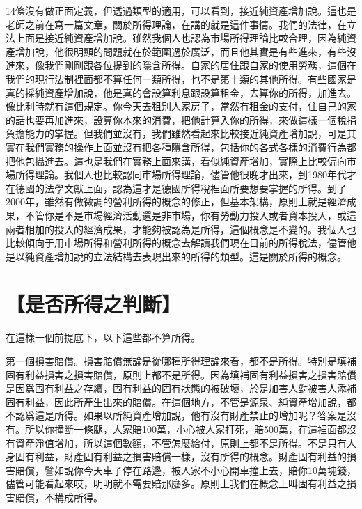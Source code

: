 \documentclass[]{ctexbook}
\begin{document}
14條沒有做正面定義，但透過類型的適用，可以看到，接近純資產增加說。這也是老師之前在寫一篇文章，關於所得理論，在講的就是這件事情。我們的法律，在立法上面是接近純資產增加說。雖然我個人也認為市場所得理論比較合理，因為純資產增加說，他很明顯的問題就在於範圍過於廣泛，而且他其實是有些進來，有些沒進來，像我們剛剛跟各位提到的隱含所得。自家的居住跟自家的使用勞務，這個在我們的現行法制裡面都不算任何一類所得，也不是第十類的其他所得。有些國家是真的採純資產增加說，他是真的會設算利息跟設算租金，去算你的所得，加進去。像比利時就有這個規定。你今天去租別人家房子，當然有租金的支付，住自己的家的話也要再加進來，設算你本來的消費，把他計算入你的所得，來做這樣一個稅捐負擔能力的掌握。但我們並沒有，我們雖然看起來比較接近純資產增加說，可是其實在我們實務的操作上面並沒有把各種隱含所得，包括你的各式各樣的消費行為都把他包攝進去。這也是我們在實務上面來講，看似純資產增加，實際上比較偏向市場所得理論。我個人也比較認同市場所得理論，儘管他很晚才出來，到1980年代才在德國的法學文獻上面，認為這才是德國所得稅裡面所要想要掌握的所得。到了2000年，雖然有做微調的營利所得的概念的修正，但基本架構，原則上就是經濟成果，不管你是不是市場經濟活動還是非市場，你有勞動力投入或者資本投入，或這兩者相加的投入的經濟成果，才能夠被認為是所得，這個概念是不變的。我個人也比較傾向于用市場所得和營利所得的概念去解讀我們現在目前的所得稅法，儘管他是以純資產增加說的立法結構去表現出來的所得的類型。這是關於所得的概念。

\hypertarget{ux662fux5426ux6240ux5f97ux4e4bux5224ux65b7}{%
\section{【是否所得之判斷】}\label{ux662fux5426ux6240ux5f97ux4e4bux5224ux65b7}}

在這樣一個前提底下，以下這些都不算所得。

第一個損害賠償。損害賠償無論是從哪種所得理論來看，都不是所得。特別是填補固有利益損害之損害賠償，原則上都不是所得。因為填補固有利益損害之損害賠償是因爲固有利益之存續，固有利益的固有狀態的被破壞，於是加害人對被害人添補固有利益，因此所產生出來的賠償。在這個地方，不管是源泉、純資產增加說，都不認爲這是所得。如果以所純資產增加說，他有沒有財產禁止的增加呢？答案是沒有。所以你撞斷一條腿，人家賠100萬，小心被人家打死，賠500萬，在這裡面都沒有資產淨值增加，所以這個數額，不管怎麼給付，原則上都不是所得。不是只有人身固有利益，財產固有利益之損害賠償一樣，沒有所得的概念。財產固有利益的損害賠償，譬如說你今天車子停在路邊，被人家不小心開車撞上去，賠你10萬塊錢，儘管可能看起來哎，明明就不需要賠那麼多。原則上我們在概念上叫固有利益之損害賠償，不構成所得。
\end{document}
